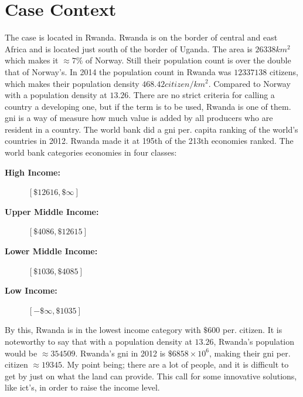 \chapter{Case Context}
The case is located in Rwanda. Rwanda is on the border of central and east Africa and is located just south of the border of Uganda. 
The area is $26338km^2$ which makes it $\approx 7\%$ of Norway. 
Still their population count is over the double that of Norway's. 
In 2014 the population count in Rwanda was $12337138$ citizens, which makes their population density $468.42citizen/km^2$. 
Compared to Norway with a population density at $13.26$. 
There are no strict criteria for calling a country a developing one, but if the term is to be used, Rwanda is one of them. 
\gls{gni} is a way of measure how much value is added by all producers who are resident in a country. 
The world bank did a \gls{gni} per. capita ranking of the world's countries in 2012. Rwanda made it at 195th of the 213th economies ranked. The world bank categories economies in four classes:
\begin{description}
\item[\textbf{High Income:}]{$[\$12616, \$\infty]$}
\item[\textbf{Upper Middle Income:}]{$[\$4086, \$12615]$}
\item[\textbf{Lower Middle Income:}]{$[\$1036, \$4085]$}
\item[\textbf{Low Income:}]{$[-\$\infty, \$1035]$}
\end{description}

By this, Rwanda is in the lowest income category with $\$600$ per. citizen.
It is noteworthy to say that with a population density at $13.26$, Rwanda's population would be $\approx 354509$.
Rwanda's \gls{gni} in 2012 is $\$6858 \times 10^{6}$, making their \gls{gni} per. citizen $\approx 19345$. My point being; there are a lot of people, and it is difficult to get by just on what the land can provide. This call for some innovative solutions, like \gls{ict}'s, in order to raise the income level.

\cite{rw:snl}
\cite{ssb:folketall}
\cite{gni:wb}
\cite{gni:wbper}

